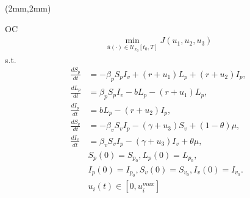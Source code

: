 	\begin{frame}[plain]
		\begin{textblock*}{120mm}(2mm,2mm)
			\begin{yellowbox}{OC}
				\begin{align*}
				\min_{\bar{u}(\cdot)\in \mathcal{U}_{x_0}[t_0,T]}J(u_1,u_2,u_3)
				\end{align*}
				s.t.
				\begin{equation*}
					\begin{aligned}
						\frac{dS_p}{dt} &=
						 -\beta_p S_p I_v +(r +u_1)L_p + (r + u_2) I_p,
						 \\
						\frac{dL_p}{dt} &=
						\beta_p S_p I_v -b L_p -(r + u_1)L_p,
						\\
						\frac{dI_p}{dt} &= 
						b L_p - (r + u_2) I_p,
						\\
						\frac{dS_v}{dt} &=
						-\beta_v S_v I_p - (\gamma+u_3) S_v +(1-\theta)\mu,
						\\
						\frac{dI_v}{dt} &=
						\beta_v S_v I_p -(\gamma+u_3) I_v +\theta\mu,
						\\
						&S_p(0) = S_{p_0}, L_p(0) = L_{p_0},
						\\
						&I_p(0) = I_{p_0},S_v(0) = S_{v_0}, I_v(0) = I_{v_0}.
						\\
						&u_i(t)\in[0,u_i^{max}]
						\end{aligned}%
				\end{equation*}
			\end{yellowbox}
		\end{textblock*}
	\end{frame}
